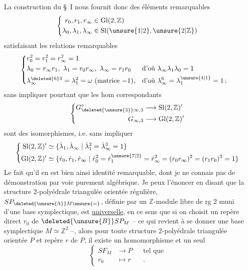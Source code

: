 La construction du \S~I nous fournit donc des éléments remarquables
\[
\left\{\begin{aligned}
r_0,r_1,r_\infty&\in\mathrm{Gl}(2,\mathbb Z)\\
\lambda_0,\lambda_1,\lambda_\infty&\in\mathrm{Sl}(\unsure{1|2},\unsure{2|\mathbb Z})
\end{aligned}\right.
\]
satisfaisant les relations remarquables
\[
\left\{\begin{aligned}
&r_0^2=r_1^2=r_\infty^2=1\\
&\lambda_0=r_\infty r_1,\ \lambda_1=r_0r_\infty,\ \lambda_\infty=r_1r_0
&&\text{d'où }\lambda_\infty\lambda_1\lambda_0=1\\
&\lambda_\infty^{\deleted{6}3}=\lambda_1^2=\omega\ \text{(matrice $-1$)},&&\text{d'où }\lambda_\infty^6=\lambda_1^{\unsure{4|1}}=1\,;
\end{aligned}\right.
\]
sans impliquer pourtant que les hom correspondants
\[
\left\{\begin{aligned}
G^\circ_{\deleted{\unsure{3}}\infty,3}&\longrightarrow\mathrm{Sl}(2,\mathbb Z)'\\
G_{\infty,3}&\longrightarrow\mathrm{Gl}(2,\mathbb Z)'
\end{aligned}\right.
\]
sont des isomorphismes, i.e. sans impliquer
\[
\left\{\begin{aligned}
\mathrm{Sl}(2,\mathbb Z)'&\simeq\{\dot{\lambda}_1,\dot{\lambda}_\infty\mid\dot{\lambda}_1^2=\dot{\lambda}_\infty^3=1\}\\
\mathrm{Gl}(2,\mathbb Z)'&\simeq\{\dot{r}_0,\dot{r}_1,\dot{r}_\infty\mid
\dot{r}_0^2=\dot{r}_1^{\unsure{7|2}}=\dot{r}_\infty^2=(r_0r_\infty)^2=(r_1r_0)^3=1\}
\end{aligned}\right.
\]
Le fait qu'il en est bien ainsi  identité remarquable, dont je ne connais pas de démonstration par voie purement algébrique. Je peux l'énoncer en disant que la structure 2-polyédrale triangulée orientée régulière,  $SP_{\deleted{\unsure{\Lambda}}M\unsure{=}}$, définie par un $\mathbb Z$-module  libre de rg 2 muni d'une base symplectique, est \uline{universelle}, en ce sens
que si on choisit un repère direct $r_0$  de $\deleted{\unsure{B}}SP_M$ -- ce qui revient à se donner une base symplectique $M\simeq\mathbb Z^2$ --, alors pour toute structure 2-polyédrale triangulée orientée $P$ et  repère $r$ de $P$, il existe un homomorphisme et un seul
\[
\left\{\begin{aligned}
SF_M&\longrightarrow P&&\text{tel que}\\
r_0&\longmapsto r&&.
\end{aligned}\right.
\]

